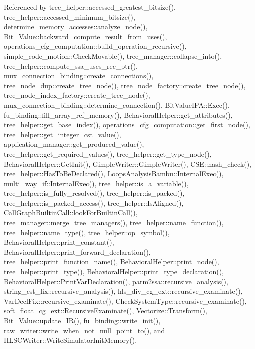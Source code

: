Referenced by tree\+\_\+helper\+::accessed\+\_\+greatest\+\_\+bitsize(), tree\+\_\+helper\+::accessed\+\_\+minimum\+\_\+bitsize(), determine\+\_\+memory\+\_\+accesses\+::analyze\+\_\+node(), Bit\+\_\+\+Value\+::backward\+\_\+compute\+\_\+result\+\_\+from\+\_\+uses(), operations\+\_\+cfg\+\_\+computation\+::build\+\_\+operation\+\_\+recursive(), simple\+\_\+code\+\_\+motion\+::\+Check\+Movable(), tree\+\_\+manager\+::collapse\+\_\+into(), tree\+\_\+helper\+::compute\+\_\+ssa\+\_\+uses\+\_\+rec\+\_\+ptr(), mux\+\_\+connection\+\_\+binding\+::create\+\_\+connections(), tree\+\_\+node\+\_\+dup\+::create\+\_\+tree\+\_\+node(), tree\+\_\+node\+\_\+factory\+::create\+\_\+tree\+\_\+node(), tree\+\_\+node\+\_\+index\+\_\+factory\+::create\+\_\+tree\+\_\+node(), mux\+\_\+connection\+\_\+binding\+::determine\+\_\+connection(), Bit\+Value\+I\+P\+A\+::\+Exec(), fu\+\_\+binding\+::fill\+\_\+array\+\_\+ref\+\_\+memory(), Behavioral\+Helper\+::get\+\_\+attributes(), tree\+\_\+helper\+::get\+\_\+base\+\_\+index(), operations\+\_\+cfg\+\_\+computation\+::get\+\_\+first\+\_\+node(), tree\+\_\+helper\+::get\+\_\+integer\+\_\+cst\+\_\+value(), application\+\_\+manager\+::get\+\_\+produced\+\_\+value(), tree\+\_\+helper\+::get\+\_\+required\+\_\+values(), tree\+\_\+helper\+::get\+\_\+type\+\_\+node(), Behavioral\+Helper\+::\+Get\+Init(), Gimple\+Writer\+::\+Gimple\+Writer(), C\+S\+E\+::hash\+\_\+check(), tree\+\_\+helper\+::\+Has\+To\+Be\+Declared(), Loops\+Analysis\+Bambu\+::\+Internal\+Exec(), multi\+\_\+way\+\_\+if\+::\+Internal\+Exec(), tree\+\_\+helper\+::is\+\_\+a\+\_\+variable(), tree\+\_\+helper\+::is\+\_\+fully\+\_\+resolved(), tree\+\_\+helper\+::is\+\_\+packed(), tree\+\_\+helper\+::is\+\_\+packed\+\_\+access(), tree\+\_\+helper\+::\+Is\+Aligned(), Call\+Graph\+Builtin\+Call\+::look\+For\+Builtin\+Call(), tree\+\_\+manager\+::merge\+\_\+tree\+\_\+managers(), tree\+\_\+helper\+::name\+\_\+function(), tree\+\_\+helper\+::name\+\_\+type(), tree\+\_\+helper\+::op\+\_\+symbol(), Behavioral\+Helper\+::print\+\_\+constant(), Behavioral\+Helper\+::print\+\_\+forward\+\_\+declaration(), tree\+\_\+helper\+::print\+\_\+function\+\_\+name(), Behavioral\+Helper\+::print\+\_\+node(), tree\+\_\+helper\+::print\+\_\+type(), Behavioral\+Helper\+::print\+\_\+type\+\_\+declaration(), Behavioral\+Helper\+::\+Print\+Var\+Declaration(), parm2ssa\+::recursive\+\_\+analysis(), string\+\_\+cst\+\_\+fix\+::recursive\+\_\+analysis(), hls\+\_\+div\+\_\+cg\+\_\+ext\+::recursive\+\_\+examinate(), Var\+Decl\+Fix\+::recursive\+\_\+examinate(), Check\+System\+Type\+::recursive\+\_\+examinate(), soft\+\_\+float\+\_\+cg\+\_\+ext\+::\+Recursive\+Examinate(), Vectorize\+::\+Transform(), Bit\+\_\+\+Value\+::update\+\_\+\+I\+R(), fu\+\_\+binding\+::write\+\_\+init(), raw\+\_\+writer\+::write\+\_\+when\+\_\+not\+\_\+null\+\_\+point\+\_\+to(), and H\+L\+S\+C\+Writer\+::\+Write\+Simulator\+Init\+Memory().


